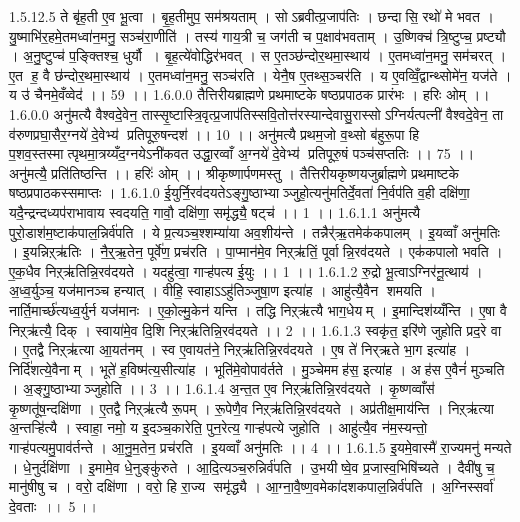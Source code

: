 1.5.12.5
ते बृ॑ह॒ती ए॒व भू॒त्वा । बृ॒ह॒तीमुप॒ सम॑श्रयताम् । सोऽब्रवीत्प्र॒जाप॑तिः । छन्दा॑सि॒ रथो॑ मे भवत । यु॒ष्माभि॑र॒हमे॒तमध्वा॑न॒मनु॒ सञ्च॑रा॒णीति॑ । तस्य॑ गाय॒त्री च॒ जग॑ती च प॒क्षाव॑भवताम् । उ॒ष्णिक्च॑ त्रि॒ष्टुप्च॒ प्रष्ट्यौ । अ॒नु॒ष्टुप्च॑ प॒ङ्क्तिश्च॒ धुर्यौ । बृ॒ह॒त्ये॑वोद्धिर॑भवत् । स ए॒तञ्छ॑न्दोर॒थमा॒स्थाय॑ । ए॒तमध्वा॑न॒मनु॒ सम॑चरत् । ए॒त ह॒ वै छ॑न्दोर॒थमा॒स्थाय॑ । ए॒तमध्वा॑न॒मनु॒ सञ्च॑रति । येनै॒ष ए॒तथ्स॒ञ्चर॑ति । य ए॒वव्विँ॒द्वान्थ्सोमे॑न॒ यज॑ते । य उ॑ चैनमे॒वँव्वेद॑ ।। 59 ।।
1.6.0.0
तैत्तिरीयब्राह्मणे प्रथमाष्टके षष्ठप्रपाठक प्रारंभः । हरिः ओम् ।।
1.6.0.0
अनु॑मत्यै वैश्वदे॒वेन॒ तास्सृ॒ष्टास्त्रि॒वृत्प्र॒जाप॑तिस्सवि॒तोत्त॑रस्यान्देवासु॒रास्सोऽग्निर्यत्पत्नी॑ वैश्वदे॒वेन॒ ता व॑रुणप्रघा॒सैर॒ग्नये॑ दे॒वेभ्य॑ प्रतिपूरु॒षन्दश॑ ।। 10 ।। अनु॑मत्यै प्रथम॒जो व॒थ्सो ब॑हुरू॒पा हि प॒शव॒स्तस्मात्पृथमा॒त्रय्यँद॒ग्नयेऽनी॑कवत उद्धा॒रव्वाँ अ॒ग्नये॑ दे॒वेभ्य॑ प्रतिपूरु॒षं पञ्च॑सप्ततिः ।। 75 ।। अनु॑मत्यै॒ प्रति॑तिष्ठन्ति ।। हरिः॑ ओम् ।। श्रीकृष्णार्पणमस्तु । तैत्तिरीयकृष्णयजुर्ब्राह्मणे प्रथमाष्टके षष्ठप्रपाठकस्समाप्तः ।
1.6.1.0
ई॒युर्नि॒रव॑दयतेऽङ्गु॒ष्ठाभ्याञ्जुहो॒त्यनु॑मतिर्दे॒वता॑ नि॒र्वप॑ति व॒ही दक्षि॑णा॒ यदै॒न्द्रन्दध्यप॑राभावाय स्वदयति॒ गावौ॒ दक्षि॑णा॒ समृ॑द्ध्यै॒ षट्च॑ ।। 1 ।।
1.6.1.1
अनु॑मत्यै पुरो॒डाश॑म॒ष्टाक॑पाल॒न्निर्व॑पति । ये प्र॒त्यञ्च॒श्शम्या॑या अव॒शीय॑न्ते । तन्नैर्॑ऋ॒तमेक॑कपालम् । इ॒यव्वाँ अनु॑मतिः । इ॒यन्निऱ्ऋ॑तिः । नै॒र्॒ऋ॒तेन॒ पूर्वे॑ण॒ प्रच॑रति । पा॒प्मान॑मे॒व निऱ्ऋ॑तिं॒ पूर्वान्नि॒रव॑दयते । एक॑कपालो भवति । ए॒क॒धैव निऱ्ऋ॑तिन्नि॒रव॑दयते । यदहु॑त्वा॒ गाऱ्ह॑पत्य ई॒युः ।। 1 ।।
1.6.1.2
रु॒द्रो भू॒त्वाऽग्निर॑नू॒त्थाय॑ । अ॒ध्व॒र्युञ्च॒ यज॑मानञ्च हन्यात् । वीहि॒ स्वाहाऽऽहु॑तिञ्जुषा॒ण इत्या॑ह । आहु॑त्यै॒वैन॑ शमयति । नार्ति॒मार्च्छ॑त्यध्व॒र्युर्न यज॑मानः । ए॒को॒ल्मु॒केन॑ यन्ति । तद्धि निऱ्ऋ॑त्यै भाग॒धेयम् । इ॒मान्दिश॑य्यँन्ति । ए॒षा वै निऱ्ऋ॑त्यै॒ दिक् । स्वाया॑मे॒व दि॒शि निऱ्ऋ॑तिन्नि॒रव॑दयते ।। 2 ।।
1.6.1.3
स्वकृ॑त॒ इरि॑णे जुहोति प्रद॒रे वा । ए॒तद्वै निऱ्ऋ॑त्या आ॒यत॑नम् । स्व ए॒वायत॑ने॒ निऱ्ऋ॑तिन्नि॒रव॑दयते । ए॒ष ते॑ निर्‌ऋते भा॒ग इत्या॑ह । निर्दि॑शत्ये॒वैनाम् । भूते॑ ह॒विष्म॑त्य॒सीत्या॑ह । भूति॑मे॒वोपाव॑र्तते । मु॒ञ्चेममह॑स॒ इत्या॑ह । अह॑स ए॒वैनं॑ मुञ्चति । अ॒ङ्गु॒ष्ठाभ्याञ्जुहोति ।। 3 ।।
1.6.1.4
अ॒न्त॒त ए॒व निऱ्ऋ॑तिन्नि॒रव॑दयते । कृ॒ष्णव्वाँस॑ कृ॒ष्णतू॑ष॒न्दक्षि॑णा । ए॒तद्वै निऱ्ऋ॑त्यै रू॒पम् । रू॒पेणै॒व निऱ्ऋ॑तिन्नि॒रव॑दयते । अप्र॑तीक्ष॒माय॑न्ति । निऱ्ऋ॑त्या अ॒न्तऱ्हि॑त्यै । स्वाहा॒ नमो॒ य इ॒दञ्च॒कारेति॒ पुन॒रेत्य॒ गाऱ्ह॑पत्ये जुहोति । आहु॑त्यै॒व न॑म॒स्यन्तो॒ गाऱ्ह॑पत्यमु॒पाव॑र्तन्ते । आ॒नु॒म॒तेन॒ प्रच॑रति । इ॒यव्वाँ अनु॑मतिः ।। 4 ।।
1.6.1.5
इ॒यमे॒वास्मै॑ रा॒ज्यमनु॑ मन्यते । धे॒नुर्दक्षि॑णा । इ॒मामे॒व धे॒नुङ्कु॑रुते । आ॒दि॒त्यञ्च॒रुन्निर्व॑पति । उ॒भयीष्वे॒व प्र॒जास्व॒भिषि॑च्यते । दैवी॑षु च॒ मानु॑षीषु च । वरो॒ दक्षि॑णा । वरो॒ हि रा॒ज्य समृ॑द्ध्यै । आ॒ग्ना॒वै॒ष्ण॒वमेका॑दशकपाल॒न्निर्व॑पति । अ॒ग्निस्सर्वा॑ दे॒वताः ।। 5 ।।
